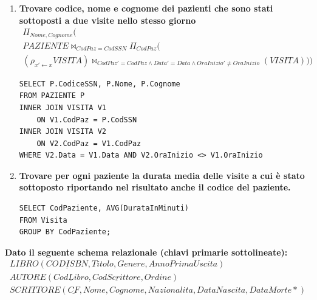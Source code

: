 \documentclass{article}
\begin{document}
\begin{enumerate}
\item \textbf{Trovare codice, nome e cognome dei pazienti che sono stati sottoposti a due visite nello stesso giorno}
\begin{align*}
	\Pi_{Nome,Cognome}(\qquad\qquad\qquad\qquad\qquad\qquad\qquad\qquad\qquad\qquad\qquad\qquad\qquad\qquad\qquad\\PAZIENTE \bowtie_{CodPaz = CodSSN }\Pi_{CodPaz}(\qquad\qquad\qquad\qquad\qquad\qquad\qquad\qquad\qquad\\(\rho_{x'\leftarrow x} VISITA) \bowtie_{CodPaz'= CodPaz \land Data' = Data\land OraInizio' \neq OraInizio}(VISITA)))
\end{align*}
\begin{lstlisting}[style=sqlstyle]
SELECT P.CodiceSSN, P.Nome, P.Cognome
FROM PAZIENTE P
INNER JOIN VISITA V1
	ON V1.CodPaz = P.CodSSN
INNER JOIN VISITA V2
	ON V2.CodPaz = V1.CodPaz
WHERE V2.Data = V1.Data AND V2.OraInizio <> V1.OraInizio
\end{lstlisting}
\item \textbf{Trovare per ogni paziente la durata media delle visite a cui è stato sottoposto riportando nel risultato anche il codice del paziente.}
\begin{lstlisting}[style=sqlstyle]
SELECT CodPaziente, AVG(DurataInMinuti)
FROM Visita
GROUP BY CodPaziente;
\end{lstlisting}
\end{enumerate}

\textbf{Dato il seguente schema relazionale (chiavi primarie sottolineate):}
\begin{align*}
	LIBRO(\underline{CODISBN},Titolo,Genere,AnnoPrimaUscita)\\
	AUTORE(\underline{CodLibro},\underline{CodScrittore},Ordine)\\
	SCRITTORE(\underline{CF},Nome,Cognome,Nazionalita,DataNascita,DataMorte*)
\end{align*}
\end{document}
